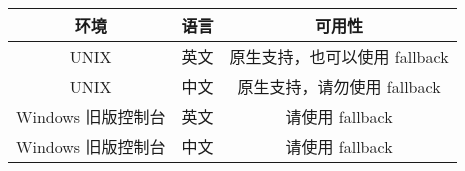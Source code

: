\documentclass[hyperref,UTF8,a4paper]{ctexart}
\begin{document}
\begin{longtable}[]{@{}ccc@{}}
\toprule
\begin{minipage}[b]{0.25\columnwidth}\centering
环境\strut
\end{minipage} & \begin{minipage}[b]{0.09\columnwidth}\centering
语言\strut
\end{minipage} & \begin{minipage}[b]{0.46\columnwidth}\centering
可用性\strut
\end{minipage}\tabularnewline
\midrule
\endhead
\begin{minipage}[t]{0.25\columnwidth}\centering
UNIX\strut
\end{minipage} & \begin{minipage}[t]{0.09\columnwidth}\centering
英文\strut
\end{minipage} & \begin{minipage}[t]{0.46\columnwidth}\centering
原生支持，也可以使用 fallback\strut
\end{minipage}\tabularnewline
\begin{minipage}[t]{0.25\columnwidth}\centering
UNIX\strut
\end{minipage} & \begin{minipage}[t]{0.09\columnwidth}\centering
中文\strut
\end{minipage} & \begin{minipage}[t]{0.46\columnwidth}\centering
原生支持，请勿使用 fallback\strut
\end{minipage}\tabularnewline
\begin{minipage}[t]{0.25\columnwidth}\centering
Windows 旧版控制台\strut
\end{minipage} & \begin{minipage}[t]{0.09\columnwidth}\centering
英文\strut
\end{minipage} & \begin{minipage}[t]{0.46\columnwidth}\centering
请使用 fallback\strut
\end{minipage}\tabularnewline
\begin{minipage}[t]{0.25\columnwidth}\centering
Windows 旧版控制台\strut
\end{minipage} & \begin{minipage}[t]{0.09\columnwidth}\centering
中文\strut
\end{minipage} & \begin{minipage}[t]{0.46\columnwidth}\centering
请使用 fallback\strut
\end{minipage}\tabularnewline

\end{longtable}
\end{document}
